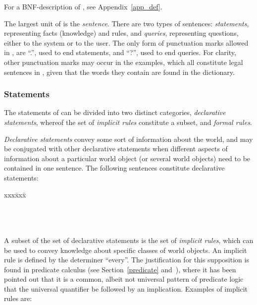 For a BNF-description of {\nal}, see Appendix~\ref{app_def}.

The largest unit of {\nal} is the {\em sentence\/}. There are two
types of sentences: {\em statements\/}, representing facts (knowledge)
and rules, and {\em queries\/}, representing questions, either to the
system or to the user. The only form of punctuation marks allowed in
{\nal}, are ``.'', used to end statements, and ``?'', used to end
queries. For clarity, other punctuation marks may occur in the
examples, which all constitute legal sentences in {\nal}, given that
the words they contain are found in the dictionary.

\subsubsection{Statements}

The statements of {\nal} can be divided into two distinct categories,
{\em declarative statements\/}, whereof the set of {\em implicit
rules\/} constitute a subset, and {\em formal rules\/}.

{\em Declarative statements\/} convey some sort of information about
the world, and may be conjugated with other declarative statements
when different aspects of information about a particular world object
(or several world objects) need to be contained in one sentence. The
following sentences constitute declarative statements:

\begin{tabbing}
  xxx\= xxx\= \kill
  \>\\
  \>\\
  \>\\
  \>\\
  \>
\end{tabbing}

A subset of the set of declarative statements is the set of {\em
implicit rules\/}, which can be used to convey knowledge about
specific classes of world objects. An implicit rule is defined by the
determiner ``every''. The justification for this supposition is found
in predicate calculus (see Section~\ref{predicate} and~\cite{logic}),
where it has been pointed out that it is a common, albeit not
universal pattern of predicate logic that the universal quantifier be
followed by an implication. Examples of implicit rules are:

